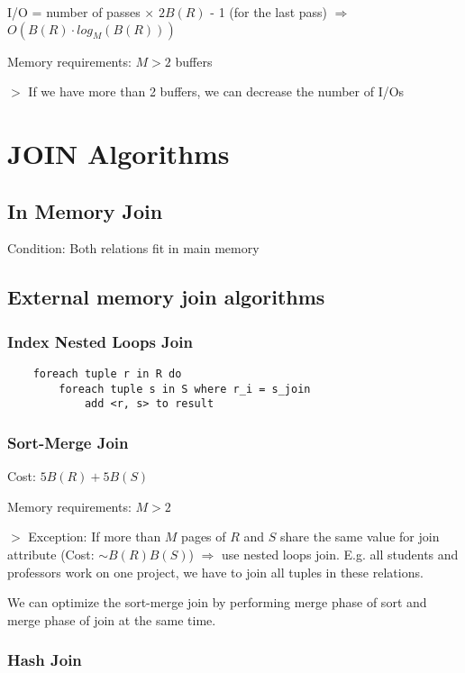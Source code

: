 \documentclass[12pt,a4paper]{article}
\newcommand{\remark}[1]{
    $>$ {\color{blue} #1}
}
\begin{document}
I/O = number of passes $\times$  $2B(R)$ - 1 (for the last pass) 
$\Rightarrow$ $O(B(R) \cdot log_M(B(R)))$

Memory requirements: $M > 2$ buffers

\remark{If we have more than 2 buffers, we can decrease the number of I/Os}

\section*{JOIN Algorithms}

\subsection*{In Memory Join}

Condition: Both relations fit in main memory

\subsection*{External memory join algorithms}

\subsubsection*{Index Nested Loops Join}

\begin{verbatim}
    foreach tuple r in R do
        foreach tuple s in S where r_i = s_join
            add <r, s> to result
\end{verbatim}

\subsubsection*{Sort-Merge Join}

Cost: $5B(R) + 5B(S)$

Memory requirements: $M > 2$

\remark{Exception: If more than $M$ pages of $R$ and $S$ share the same value for join attribute (Cost: $\sim B(R)B(S)$) $\Rightarrow$ use nested loops join. E.g. all students and professors work on one project, we have to join all tuples in
these relations.}

We can optimize the sort-merge join by performing merge phase of sort and merge phase of join at the same time.

\subsubsection*{Hash Join}
\end{document}
